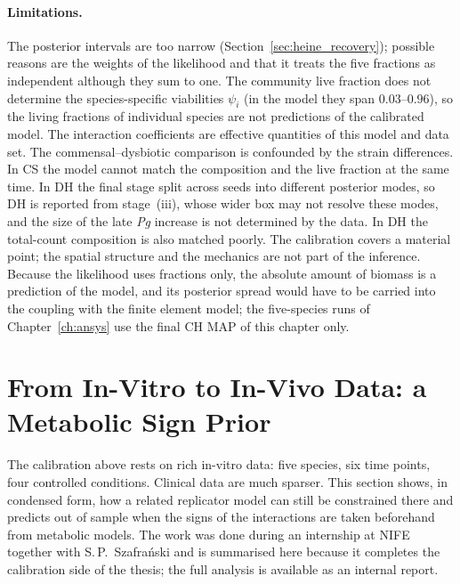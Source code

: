 \paragraph{Limitations.}
The posterior intervals are too narrow (Section~\ref{sec:heine_recovery});
possible reasons are the weights of the likelihood and that it treats the five
fractions as independent although they sum to one. The community live
fraction does not determine the species-specific viabilities $\psi_i$ (in the
model they span $0.03$--$0.96$), so the living fractions of individual species
are not predictions of the calibrated model. The interaction coefficients are
effective quantities of this model and data set. The commensal--dysbiotic
comparison is confounded by the strain differences. In CS the model cannot match
the composition and the live fraction at the same time. In DH the final stage
split across seeds into different posterior modes, so DH is reported from
stage~(iii), whose wider box may not resolve these modes, and the size of the
late \textit{Pg} increase is not determined by the data. In DH the total-count
composition is also matched poorly. The calibration covers a material point; the
spatial structure and the mechanics are not part of the inference. Because the
likelihood uses fractions only, the absolute amount of biomass is a prediction of
the model, and its posterior spread would have to be carried into the coupling
with the finite element model; the five-species runs of
Chapter~\ref{ch:ansys} use the final CH MAP of this chapter only.

\section{From In-Vitro to In-Vivo Data: a Metabolic Sign Prior}
\label{sec:heine_signprior}

The calibration above rests on rich in-vitro data: five species, six time points,
four controlled conditions. Clinical data are much sparser. This section shows,
in condensed form, how a related replicator model can still be constrained there
and predicts out of sample when the signs of the interactions are taken
beforehand from metabolic models. The
work was done during an internship at NIFE together with S.\,P.\ Szafra\'{n}ski
and is summarised here because it completes the calibration side of the
thesis; the full analysis is available as an internal report.

